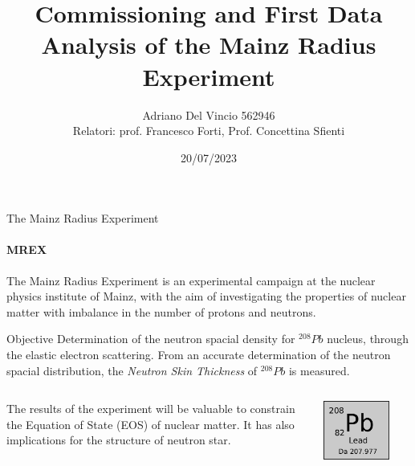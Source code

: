 \documentclass[9pt,a4paper]{beamer}
\author[Adriano Del Vincio]{Adriano Del Vincio 562946\\ \footnotesize Relatori: prof. Francesco Forti, Prof. Concettina Sfienti}
\institute[Università di Pisa]{\textbf {Università di Pisa}}
\title[Tesi di Laurea]{Commissioning and First Data Analysis of the Mainz Radius Experiment}
\subtitle{}
\date{20/07/2023}
\begin{document}
\setlength{\belowdisplayskip}{0pt}
\setlength{\abovedisplayskip}{0pt}


\frame{\titlepage}


\begin{frame}{The Mainz Radius Experiment}
\framesubtitle{MREX}

The Mainz Radius Experiment is an experimental campaign at the nuclear physics institute of Mainz, with the aim of investigating the properties of nuclear matter with imbalance in the number of protons and neutrons.

\begin{block}{Objective}
Determination of the neutron spacial density for $^{208}Pb$ nucleus, through the elastic electron scattering. From an accurate determination of the neutron spacial distribution, the \textit{Neutron Skin Thickness} of $^{208}Pb$ is measured.
\end{block}

\begin{columns}[T]
\begin{column}{.7\textwidth}
The results of the experiment will be valuable to constrain the Equation of 	State (EOS) of nuclear matter. It has also implications for the structure of neutron 		star.
\end{column}
\begin{column}{.3\textwidth}
\centering
\includegraphics[width = 0.75\textwidth]{figures/lead.pdf}
\end{column}
\end{columns}
\end{frame}
\end{document}
